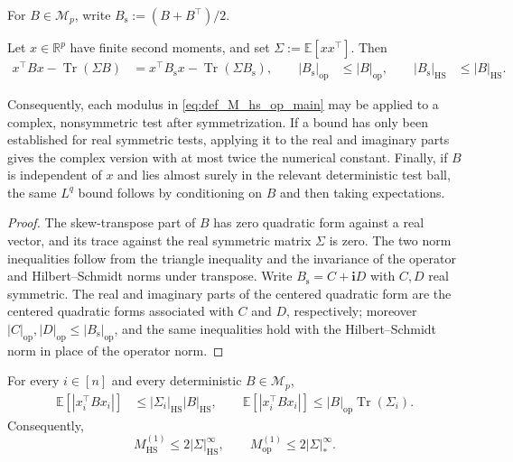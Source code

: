 \documentclass[EJP, preprint, NODS, nobera, nofontexpansion]{ejpecp}
\newcommand{\ii}{\mathbf{i}}
\DeclareMathOperator{\op}{op}
\DeclareMathOperator{\tr}{Tr}
\DeclareMathOperator{\hs}{HS}
\begin{document}
For \(B\in\mathcal M_p\), write
\(B_{\mathrm s}:=(B+B^\top)/2\).

\begin{lemma}
\label{lem:complex_conditional_test_reduction}
Let $x\in\mathbb R^p$ have finite second moments, and set $\Sigma:=\mathbb E[xx^\top]$. Then  \begin{align*}
    x^{\top}Bx-\tr(\Sigma B)
    &=x^{\top}B_{\mathrm s}x-\tr(\Sigma B_{\mathrm s}),
    \qquad 
    |B_{\mathrm s}|_{\op}&\leq|B|_{\op},
    \qquad
    |B_{\mathrm s}|_{\hs}&\leq|B|_{\hs}.
\end{align*}
\end{lemma}
Consequently, each modulus in \eqref{eq:def_M_hs_op_main} may be applied
to a complex, nonsymmetric test after symmetrization.  If a bound has only
been established for real symmetric tests, applying it to the real and
imaginary parts gives the complex version with at most twice the numerical
constant.  Finally, if \(B\) is independent of \(x\) and lies almost surely
in the relevant deterministic test ball, the same \(L^q\) bound
follows by conditioning on \(B\) and then taking expectations.

\begin{proof}
The skew-transpose part of $B$ has zero quadratic form against a real
vector, and its trace against the real symmetric matrix $\Sigma$ is zero.
The two norm inequalities follow from the triangle inequality and the
invariance of the operator and Hilbert--Schmidt norms under transpose.
Write $B_{\mathrm s}=C+\ii D$ with $C,D$ real symmetric.  The real and
imaginary parts of the centered quadratic form are the centered quadratic
forms associated with $C$ and $D$, respectively; moreover
$|C|_{\op},|D|_{\op}\leq|B_{\mathrm s}|_{\op}$, and the same inequalities
hold with the Hilbert--Schmidt norm in place of the operator norm.  
\end{proof}

\begin{lemma}
\label{lem:uncentered_quadratic_form_bound}
For every $i\in[n]$ and every deterministic $B\in\mathcal M_p$,
\begin{align}
    \mathbb E\left[|x_i^\top Bx_i|\right]
    &\leq|\Sigma_i|_{\hs}|B|_{\hs},
    \qquad \mathbb E\left[|x_i^\top Bx_i|\right]
    \leq|B|_{\op}\tr(\Sigma_i).
\end{align}
Consequently,
\[
    M_{\hs}^{(1)}\leq2|\Sigma|_{\hs}^\infty,
    \qquad M_{\op}^{(1)}\leq2|\Sigma|_*^\infty.
\]
\end{lemma}
\end{document}
